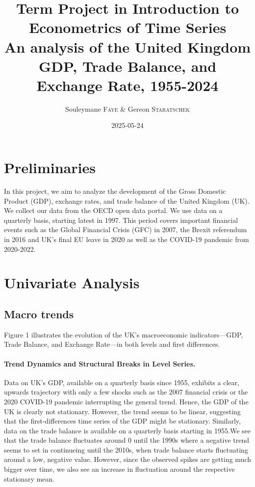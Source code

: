 \documentclass[
]{article}
\title{Term Project in Introduction to Econometrics of Time Series \\[1.5ex] 
{\Large An analysis of the United Kingdom GDP, Trade Balance, and Exchange Rate, 1955-2024}}
\author{Souleymane \textsc{Faye} \& Gereon \textsc{Staratschek}}
\date{2025-05-24}
\begin{document}
\maketitle

\section{Preliminaries}

In this project, we aim to analyze the development of the Gross Domestic
Product (GDP), exchange rates, and trade balance of the United Kingdom
(UK). We collect our data from the OECD open data portal. We use data on
a quarterly basis, starting latest in 1997. This period covers important
financial events such as the Global Financial Crisis (GFC) in 2007, the
Brexit referendum in 2016 and UK's final EU leave in 2020 as well as the
COVID-19 pandemic from 2020-2022.

\section{Univariate Analysis}

\subsection{Macro trends}

Figure 1 illustrates the evolution of the UK’s macroeconomic indicators—GDP, Trade Balance, 
and Exchange Rate—in both levels and first differences.

\paragraph*{Trend Dynamics and Structural Breaks in Level Series.} 
Data on UK's GDP, available on a quarterly basis
since 1955, exhibits a clear, upwards trajectory with only a few
shocks such as the 2007 financial crisis or the 2020 COVID-19 pandemic 
interrupting the general trend. Hence, the GDP of the UK is clearly not
stationary. However, the trend seems to be linear, suggesting that the
first-differences time series of the GDP might be stationary. Similarly, data on 
the trade balance is available on a quarterly basis starting in 1955.We see that 
the trade balance fluctuates around 0 until the 1990s where a negative trend seems to set
in continueing until the 2010s, when trade balance starts fluctuating
around a low, negative value. However, since the observed spikes are
getting much bigger over time, we also see an increase in fluctuation
around the respective stationary mean.
\end{document}
